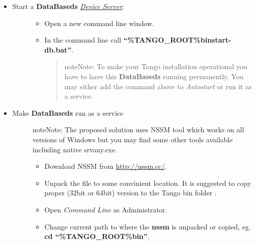 \documentclass[letterpaper,10pt,english]{sphinxmanual}
\begin{document}
\begin{itemize}
\item {} \begin{description}
\item[{Start a \textbf{DataBaseds} {\hyperref[glossary:term-device-server]{\emph{Device Server}}}:}] \leavevmode\begin{itemize}
\item {} 
Open a new command line window.

\item {} 
In the command line call \textbf{``\%TANGO\_ROOT\%binstart-db.bat''}.
\begin{quote}

\begin{notice}{note}{Note:}
To make your Tango installation operational you have to have this \textbf{DataBaseds} running permanently.
You may either add the command above to \emph{Autostart} or run it as a service.
\end{notice}
\end{quote}

\end{itemize}

\end{description}

\item {} \begin{description}
\item[{Make \textbf{DataBaseds} run as a service}] \leavevmode
\begin{notice}{note}{Note:}
The proposed solution uses NSSM tool which works on all versions of Windows but you may find some other tools
available including native srvany.exe.
\end{notice}
\begin{itemize}
\item {} 
Download NSSM from \href{http://nssm.cc/}{http://nssm.cc/}.

\item {} 
Unpack the file to some convinient location. It is suggested to copy proper (32bit or 64bit) version to the
Tango bin folder .

\item {} 
Open \emph{Command Line} as Administrator.

\item {} 
Change current path to where the \textbf{nssm} is unpacked or copied, eg. \textbf{cd ``\%TANGO\_ROOT\%bin''}.


\end{itemize}
\end{description}
\end{itemize}
\end{document}
